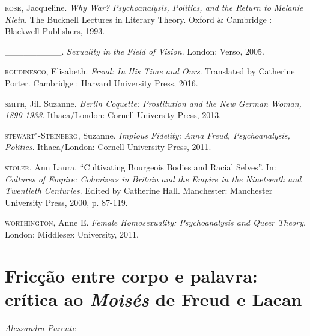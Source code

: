 \begin{Parskip}
\textsc{rose}, Jacqueline. \emph{Why War? Psychoanalysis, Politics, and the
Return to Melanie Klein}. The Bucknell Lectures in Literary Theory.
Oxford  \& Cambridge : Blackwell Publishers, 1993.

\_\_\_\_\_\_\_\_\_. \emph{Sexuality in the Field of Vision}. London: Verso, 2005.

\textsc{roudinesco}, Elisabeth. \emph{Freud: In His Time and Ours}.
Translated by Catherine Porter. Cambridge : Harvard University Press, 2016.

\textsc{smith}, Jill Suzanne. \emph{Berlin Coquette: Prostitution and the
New German Woman, 1890-1933}. Ithaca/London: Cornell University Press, 2013.

\textsc{stewart"-Steinberg}, Suzanne. \emph{Impious Fidelity: Anna Freud,
Psychoanalysis, Politics}. Ithaca/London: Cornell University Press, 2011.

\textsc{stoler}, Ann Laura. ``Cultivating Bourgeois Bodies and Racial
Selves''. In: \emph{Cultures of Empire: Colonizers in Britain and the
Empire in the Nineteenth and Twentieth Centuries}. Edited by Catherine
Hall. Manchester: Manchester University Press, 2000, p. 87-119.

\textsc{worthington}, Anne E. \emph{Female Homosexuality: Psychoanalysis and
Queer Theory}. London: Middlesex University, 2011.
\end{Parskip}

\chapter*{Fricção entre corpo e palavra:\\ crítica ao \emph{Moisés} de Freud e Lacan}

\begin{flushright}
\emph{Alessandra Parente}
\end{flushright}

